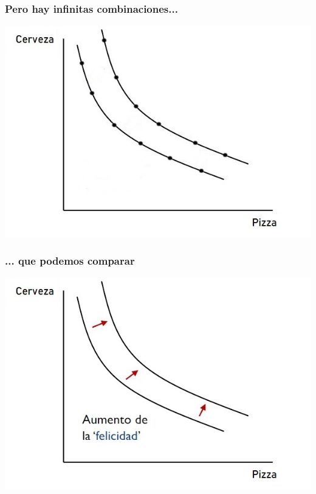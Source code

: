 \documentclass{beamer}
\begin{document}
\begin{frame}
\frametitle{Pero hay infinitas combinaciones...}
\centering
\includegraphics[scale=0.6]{Slides Principios de Economia/Figures/Tema_02.15_rp12.jpg}
\end{frame}

\begin{frame}
\frametitle{... que podemos comparar}
\centering
\includegraphics[scale=0.6]{Slides Principios de Economia/Figures/Tema_02.15_rp13.jpg}
\end{frame}
\end{document}
